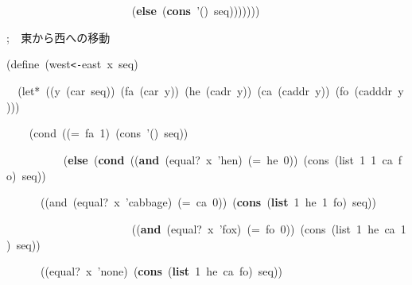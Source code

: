 \documentclass[a4paper,10pt]{article}
\def\mc{\relax}
\begin{document}
\noindent
\mbox{}{\tt\mc \ }{\tt\mc \ }{\tt\mc \ }{\tt\mc \ }{\tt\mc \ }{\tt\mc \ }{\tt\mc \ }{\tt\mc \ }{\tt\mc \ }{\tt\mc \ }{\tt\mc \ }{\tt\mc \ }{\tt\mc \ }{\tt\mc \ }{\tt\mc \ }{\tt\mc \ }{\tt\mc \ }{\tt\mc \ }{\tt\mc \ }{\tt\mc \ }{\tt\mc \ }{\tt\mc \ }(\textbf{else}{\tt\mc \ }(\textbf{cons}{\tt\mc \ }'(){\tt\mc \ }seq)))))))

\noindent
\mbox{}\hfill

\noindent
\mbox{};{\tt\mc \ }{\tt\mc \ }東から西への移動

\noindent
\mbox{}(define{\tt\mc \ }(west{\tt <}{\tt -}east{\tt\mc \ }x{\tt\mc \ }seq)

\noindent
\mbox{}{\tt\mc \ }{\tt\mc \ }(let*{\tt\mc \ }((y{\tt\mc \ }(car{\tt\mc \ }seq)){\tt\mc \ }(fa{\tt\mc \ }(car{\tt\mc \ }y)){\tt\mc \ }(he{\tt\mc \ }(cadr{\tt\mc \ }y)){\tt\mc \ }(ca{\tt\mc \ }(caddr{\tt\mc \ }y)){\tt\mc \ }(fo{\tt\mc \ }(cadddr{\tt\mc \ }y)))

\noindent
\mbox{}{\tt\mc \ }{\tt\mc \ }{\tt\mc \ }{\tt\mc \ }(cond{\tt\mc \ }((={\tt\mc \ }fa{\tt\mc \ }1){\tt\mc \ }(cons{\tt\mc \ }'(){\tt\mc \ }seq))

\noindent
\mbox{}{\tt\mc \ }{\tt\mc \ }{\tt\mc \ }{\tt\mc \ }{\tt\mc \ }{\tt\mc \ }{\tt\mc \ }{\tt\mc \ }{\tt\mc \ }{\tt\mc \ }(\textbf{else}{\tt\mc \ }(\textbf{cond}{\tt\mc \ }((\textbf{and}{\tt\mc \ }(equal?{\tt\mc \ }x{\tt\mc \ }'hen){\tt\mc \ }(={\tt\mc \ }he{\tt\mc \ }0)){\tt\mc \ }(cons{\tt\mc \ }(list{\tt\mc \ }1{\tt\mc \ }1{\tt\mc \ }ca{\tt\mc \ }fo){\tt\mc \ }seq))

\noindent
\mbox{}{\tt\mc \ }{\tt\mc \ }{\tt\mc \ }{\tt\mc \ }{\tt\mc \ }{\tt\mc \ }((and{\tt\mc \ }(equal?{\tt\mc \ }x{\tt\mc \ }'cabbage){\tt\mc \ }(={\tt\mc \ }ca{\tt\mc \ }0)){\tt\mc \ }(\textbf{cons}{\tt\mc \ }(\textbf{list}{\tt\mc \ }1{\tt\mc \ }he{\tt\mc \ }1{\tt\mc \ }fo){\tt\mc \ }seq))

\noindent
\mbox{}{\tt\mc \ }{\tt\mc \ }{\tt\mc \ }{\tt\mc \ }{\tt\mc \ }{\tt\mc \ }{\tt\mc \ }{\tt\mc \ }{\tt\mc \ }{\tt\mc \ }{\tt\mc \ }{\tt\mc \ }{\tt\mc \ }{\tt\mc \ }{\tt\mc \ }{\tt\mc \ }{\tt\mc \ }{\tt\mc \ }{\tt\mc \ }{\tt\mc \ }{\tt\mc \ }{\tt\mc \ }((\textbf{and}{\tt\mc \ }(equal?{\tt\mc \ }x{\tt\mc \ }'fox){\tt\mc \ }(={\tt\mc \ }fo{\tt\mc \ }0)){\tt\mc \ }(cons{\tt\mc \ }(list{\tt\mc \ }1{\tt\mc \ }he{\tt\mc \ }ca{\tt\mc \ }1){\tt\mc \ }seq))

\noindent
\mbox{}{\tt\mc \ }{\tt\mc \ }{\tt\mc \ }{\tt\mc \ }{\tt\mc \ }{\tt\mc \ }((equal?{\tt\mc \ }x{\tt\mc \ }'none){\tt\mc \ }(\textbf{cons}{\tt\mc \ }(\textbf{list}{\tt\mc \ }1{\tt\mc \ }he{\tt\mc \ }ca{\tt\mc \ }fo){\tt\mc \ }seq))
\end{document}
